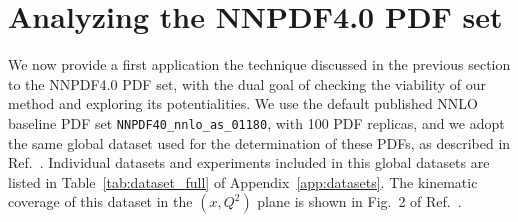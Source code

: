 \documentclass[11pt,a4paper]{article}
\begin{document}


\section{Analyzing the NNPDF4.0 PDF set}
\label{sec:results}

We now provide a first application the technique discussed in the previous section to the NNPDF4.0 PDF set, with the dual goal of checking the viability of our method and exploring its potentialities. We use the default  published  NNLO baseline PDF set
\texttt{NNPDF40\_nnlo\_as\_01180}, with 100 PDF replicas,  and we adopt the same global dataset used  for the determination of these PDFs, as described in Ref.~\cite{NNPDF:2021njg}.  Individual datasets and experiments included in this global datasets are listed in Table~\ref{tab:dataset_full} of  Appendix~\ref{app:datasets}. The kinematic coverage of this dataset in the $(x,Q^2)$ plane is shown in Fig.~2 of Ref.~\cite{NNPDF:2021njg}.
\end{document}
